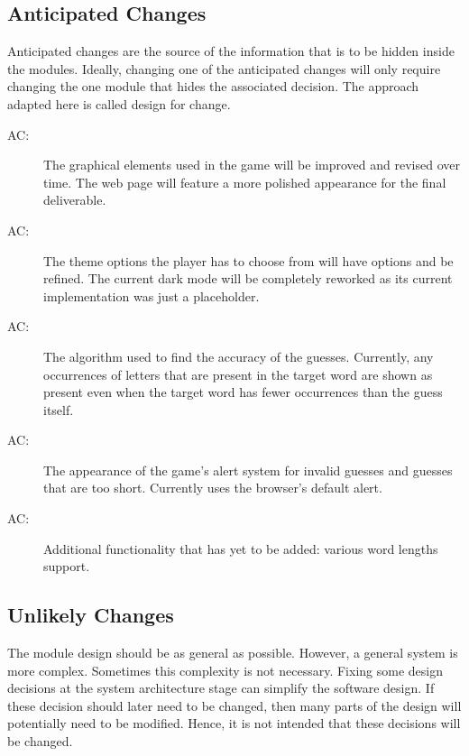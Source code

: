 \documentclass[12pt, titlepage]{article}
\newcounter{acnum}
\newcommand{\actheacnum}{AC\theacnum}
\begin{document}
	\subsection{Anticipated Changes} \label{SecAchange}
	
	Anticipated changes are the source of the information that is to be hidden
	inside the modules. Ideally, changing one of the anticipated changes will only
	require changing the one module that hides the associated decision. The approach
	adapted here is called design for
	change.
	
	\begin{description}
		\item[ \actheacnum \label{ac1}:] The graphical elements used in the game will be improved and revised over time. The web page will feature a more polished appearance for the final deliverable. 
		\item[ \actheacnum \label{ac2}:] The theme options the player has to choose from will have options and be refined. The current dark mode will be completely reworked as its current implementation was just a placeholder. 
		\item[ \actheacnum \label{ac3}:] The algorithm used to find the accuracy of the guesses. Currently, any occurrences of letters that are present in the target word are shown as present even when the target word has fewer occurrences than the guess itself. 
		\item[ \actheacnum \label{ac4}:] The appearance of the game's alert system for invalid guesses and guesses that are too short. Currently uses the browser's default alert.
		\item[ \actheacnum \label{ac5}:] Additional functionality that has yet to be added: various word lengths support. 
		
	\end{description}
	
	\subsection{Unlikely Changes} \label{SecUchange}
	
	The module design should be as general as possible. However, a general system is
	more complex. Sometimes this complexity is not necessary. Fixing some design
	decisions at the system architecture stage can simplify the software design. If
	these decision should later need to be changed, then many parts of the design
	will potentially need to be modified. Hence, it is not intended that these
	decisions will be changed.
	
\end{document}
